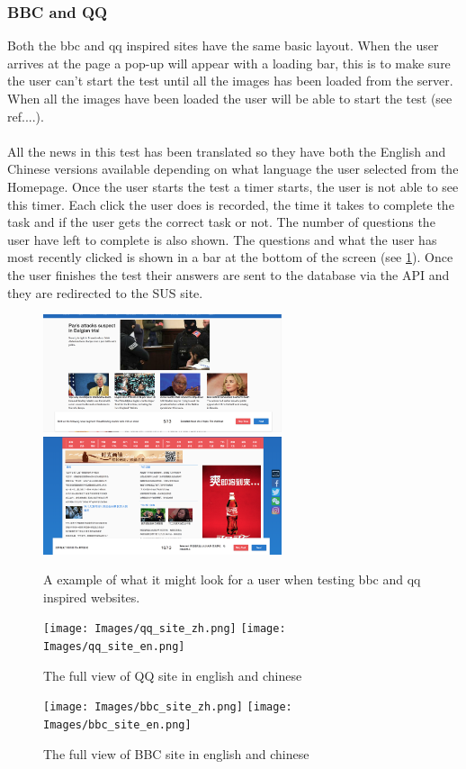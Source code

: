 \subsubsection{BBC and QQ}
Both the bbc and qq inspired sites have the same basic layout. When the user arrives at the page a pop-up will appear with a loading bar, this is to make sure the user can't start the test until all the images has been loaded from the server. When all the images have been loaded the user will be able to start the test (see ref....).  
\\\\
All the news in this test has been translated so they have both the English and Chinese versions available depending on what language the user selected from the Homepage. Once the user starts the test a timer starts, the user is not able to see this timer. Each click the user does is recorded, the time it takes to complete the task and if the user gets the correct task or not. The number of questions the user have left to complete is also shown. The questions and what the user has most recently clicked is shown in a bar at the bottom of the screen (see \ref{fig:user_view}). Once the user finishes the test their answers are sent to the database via the API and they are redirected to the SUS site. 
\begin{figure}[h]
	\centering
	\includegraphics[width=70mm]{Images/view_bbc.png}
	\includegraphics[width=70mm]{Images/view_qq.png}
	\decoRule
	\caption[Users View]{A example of what it might look for a user when testing bbc and qq inspired websites.}
	\label{fig:user_view}
\end{figure}
\begin{figure}[h]
	\centering
	\texttt{[image: Images/qq\_site\_zh.png]}
	\texttt{[image: Images/qq\_site\_en.png]}
	\decoRule
	\caption[QQ]{The full view of QQ site in english and chinese}
	\label{fig:qq_site}
\end{figure}
\begin{figure}[h]
	\centering
	\texttt{[image: Images/bbc\_site\_zh.png]}
	\texttt{[image: Images/bbc\_site\_en.png]}
	\decoRule
	\caption[BBC]{The full view of BBC site in english and chinese}
	\label{fig:bbc_site}
\end{figure}


